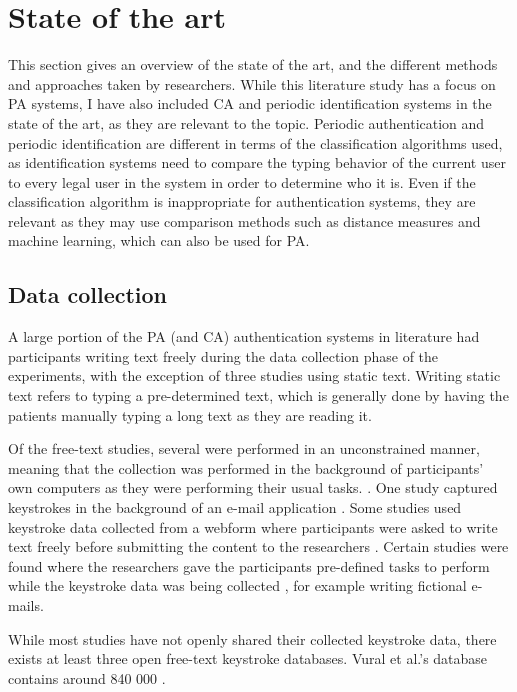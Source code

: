 \documentclass[informationsecurity]{gucmasterproject}
\begin{document}
\chapter{State of the art}
\label{chap:state}
This section gives an overview of the state of the art, and the different methods and approaches taken by researchers.
While this literature study has a focus on PA systems, I have also included CA \cite{BOURS201236, mondal} and periodic identification systems \cite{Solami, Janakiraman2007, Monrose} in the state of the art, as they are relevant to the topic.
Periodic authentication and periodic identification are different in terms of the classification algorithms used, as identification systems need to compare the typing behavior of the current user to every legal user in the system in order to determine who it is.
Even if the classification algorithm is inappropriate for authentication systems, they are relevant as they may use comparison methods such as distance measures and machine learning, which can also be used for PA.

\section{Data collection}
A large portion of the PA (and CA) authentication systems in literature had participants writing text freely during the data collection phase of the experiments, with the exception of three studies \cite{hu, KIM2017, sliding} using static text.
Writing static text refers to typing a pre-determined text, which is generally done by having the patients manually typing a long text as they are reading it.

Of the free-text studies, several were performed in an unconstrained manner, meaning that the collection was performed in the background of participants' own computers as they were performing their usual tasks. \cite{superResults, Pinto2014, Ahmed, Janakiraman2007, BOURS201236, mondal}.
One study captured keystrokes in the background of an e-mail application \cite{Messerman}.
Some studies used keystroke data collected from a webform where participants were asked to write text freely before submitting the content to the researchers \cite{gnp, davoudi2009, davoudi2010, Solami}.
Certain studies were found where the researchers gave the participants pre-defined tasks to perform while the keystroke data was being collected \cite{900words, Monrose, monaco, park}, for example writing fictional e-mails.

While most studies have not openly shared their collected keystroke data, there exists at least three open free-text keystroke databases. 
Vural et al.'s \cite{vural} database contains around 840 000
\cite{vural, gnp, sliding}.
\end{document}
